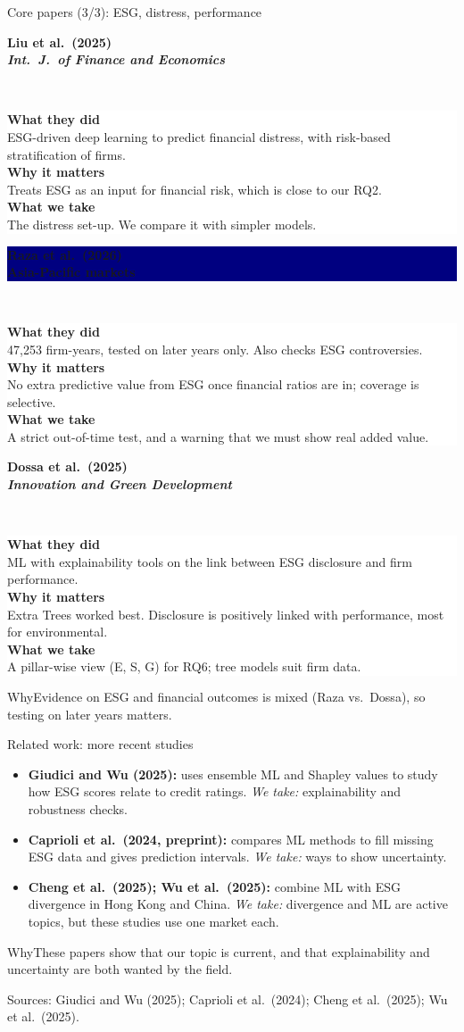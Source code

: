 \documentclass[aspectratio=169,11pt]{beamer}
\newcommand{\why}[1]{\vspace{2pt}\begin{block}{Why}#1\end{block}}
\newcommand{\whys}[1]{\vspace{0pt}\begin{block}{Why}\scriptsize #1\end{block}}
\newcommand{\src}[1]{\par\vfill{\tiny\color{navy!60}Sources: #1}}
\newcommand{\pcard}[5]{%
\begin{minipage}[t]{0.315\textwidth}
\setlength{\fboxsep}{5pt}
\colorbox{#1}{\parbox{\dimexpr\linewidth-10pt\relax}{\raggedright\small\bfseries\color{white}#2\strut}}\\[1pt]
\colorbox{white}{\parbox[t][3.95cm][t]{\dimexpr\linewidth-10pt\relax}{\raggedright\scriptsize
\textbf{\color{#1}What they did}\\#3\\[4pt]
\textbf{\color{#1}Why it matters}\\#4\\[4pt]
\textbf{\color{#1}What we take}\\#5}}
\end{minipage}}
\begin{document}
\begin{frame}[t]{Core papers (3/3): ESG, distress, performance}
\pcard{amber!85!black}{Liu et al.\ (2025)\\{\scriptsize\mdseries \emph{Int.\ J.\ of Finance and Economics}}}
{ESG-driven deep learning to predict financial distress, with risk-based stratification of firms.}
{Treats ESG as an input for financial risk, which is close to our RQ2.}
{The distress set-up. We compare it with simpler models.}
\hfill
\pcard{navy}{Raza et al.\ (2026)\\{\scriptsize{} Asia-Pacific markets}}
{47,253 firm-years, tested on later years only. Also checks ESG controversies.}
{No extra predictive value from ESG once financial ratios are in; coverage is selective.}
{A strict out-of-time test, and a warning that we must show real added value.}
\hfill
\pcard{leaf}{Dossa et al.\ (2025)\\{\scriptsize\mdseries \emph{Innovation and Green Development}}}
{ML with explainability tools on the link between ESG disclosure and firm performance.}
{Extra Trees worked best. Disclosure is positively linked with performance, most for environmental.}
{A pillar-wise view (E, S, G) for RQ6; tree models suit firm data.}
\whys{Evidence on ESG and financial outcomes is mixed (Raza vs.\ Dossa), so testing on later years matters.}
\end{frame}

\begin{frame}[t]{Related work: more recent studies}
\small
\begin{itemize}
\setlength{\itemsep}{7pt}
\item \textbf{Giudici and Wu (2025):} uses ensemble ML and Shapley values to study how ESG scores relate to credit ratings. \emph{We take:} explainability and robustness checks.
\item \textbf{Caprioli et al.\ (2024, preprint):} compares ML methods to fill missing ESG data and gives prediction intervals. \emph{We take:} ways to show uncertainty.
\item \textbf{Cheng et al.\ (2025); Wu et al.\ (2025):} combine ML with ESG divergence in Hong Kong and China. \emph{We take:} divergence and ML are active topics, but these studies use one market each.
\end{itemize}
\why{These papers show that our topic is current, and that explainability and uncertainty are both wanted by the field.}
\src{Giudici and Wu (2025); Caprioli et al.\ (2024); Cheng et al.\ (2025); Wu et al.\ (2025).}
\end{frame}
\end{document}
